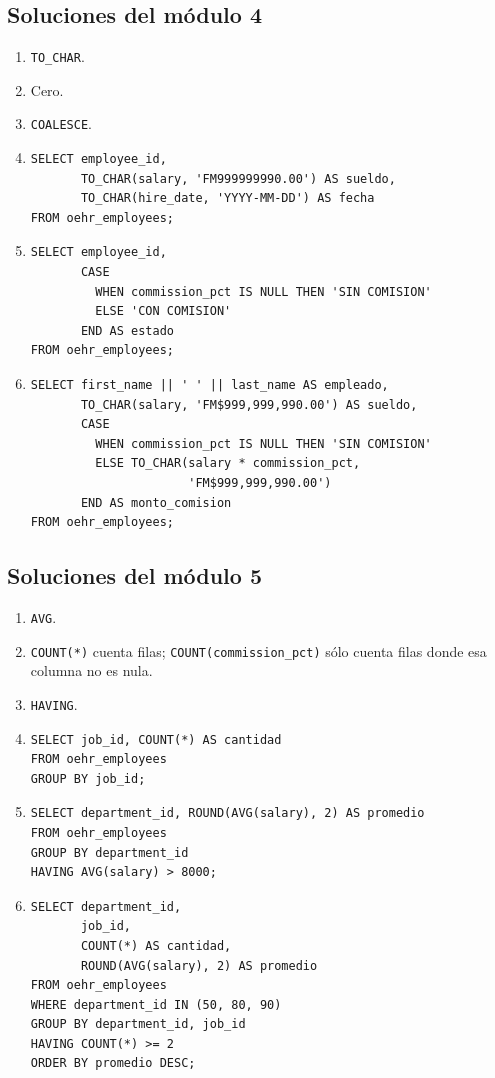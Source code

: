 \documentclass[11pt,a4paper]{article}
\newcommand{\campo}[1]{\texttt{#1}}
\begin{document}
\subsection{Soluciones del módulo 4}

\begin{enumerate}[label=\textbf{M4.\arabic*}]
  \item \campo{TO\_CHAR}.
  \item Cero.
  \item \campo{COALESCE}.
  \item
\begin{lstlisting}
SELECT employee_id,
       TO_CHAR(salary, 'FM999999990.00') AS sueldo,
       TO_CHAR(hire_date, 'YYYY-MM-DD') AS fecha
FROM oehr_employees;
\end{lstlisting}
  \item
\begin{lstlisting}
SELECT employee_id,
       CASE
         WHEN commission_pct IS NULL THEN 'SIN COMISION'
         ELSE 'CON COMISION'
       END AS estado
FROM oehr_employees;
\end{lstlisting}
  \item
\begin{lstlisting}
SELECT first_name || ' ' || last_name AS empleado,
       TO_CHAR(salary, 'FM$999,999,990.00') AS sueldo,
       CASE
         WHEN commission_pct IS NULL THEN 'SIN COMISION'
         ELSE TO_CHAR(salary * commission_pct,
                      'FM$999,999,990.00')
       END AS monto_comision
FROM oehr_employees;
\end{lstlisting}
\end{enumerate}

\subsection{Soluciones del módulo 5}

\begin{enumerate}[label=\textbf{M5.\arabic*}]
  \item \campo{AVG}.
  \item \campo{COUNT(*)} cuenta filas; \campo{COUNT(commission\_pct)} sólo cuenta filas donde esa
  columna no es nula.
  \item \campo{HAVING}.
  \item
\begin{lstlisting}
SELECT job_id, COUNT(*) AS cantidad
FROM oehr_employees
GROUP BY job_id;
\end{lstlisting}
  \item
\begin{lstlisting}
SELECT department_id, ROUND(AVG(salary), 2) AS promedio
FROM oehr_employees
GROUP BY department_id
HAVING AVG(salary) > 8000;
\end{lstlisting}
  \item
\begin{lstlisting}
SELECT department_id,
       job_id,
       COUNT(*) AS cantidad,
       ROUND(AVG(salary), 2) AS promedio
FROM oehr_employees
WHERE department_id IN (50, 80, 90)
GROUP BY department_id, job_id
HAVING COUNT(*) >= 2
ORDER BY promedio DESC;
\end{lstlisting}
\end{enumerate}
\end{document}
